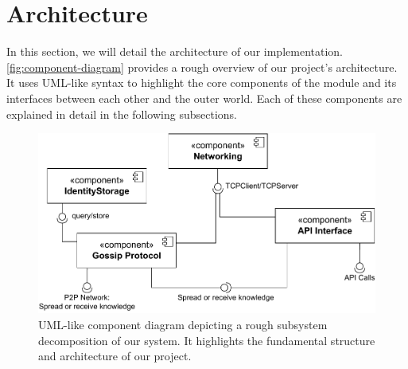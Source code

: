 \section{Architecture}\label{sec:architecture}

In this section, we will detail the architecture of our implementation.
\autoref{fig:component-diagram} provides a rough overview of our project's architecture.
It uses UML-like syntax to highlight the core components of the module and its interfaces between each other
and the outer world.
Each of these components are explained in detail in the following subsections.

\begin{figure}[h!]
    \centering
    \includegraphics[width=1\linewidth, angle=0]{images/Components-Gossip}
    \caption{UML-like component diagram depicting a rough subsystem decomposition of our system.
    It highlights the fundamental structure and architecture of our project.}
    \label{fig:component-diagram}
\end{figure}




